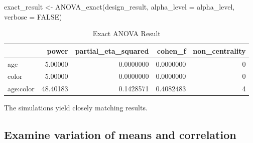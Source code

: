 \documentclass[
]{book}
\newenvironment{Shaded}{\begin{snugshade}}{\end{snugshade}}
\newcommand{\AttributeTok}[1]{\textcolor[rgb]{0.77,0.63,0.00}{#1}}
\newcommand{\ConstantTok}[1]{\textcolor[rgb]{0.00,0.00,0.00}{#1}}
\newcommand{\FunctionTok}[1]{\textcolor[rgb]{0.00,0.00,0.00}{#1}}
\newcommand{\NormalTok}[1]{#1}
\newcommand{\OtherTok}[1]{\textcolor[rgb]{0.56,0.35,0.01}{#1}}
\begin{document}
\begin{Shaded}
\begin{Highlighting}[]
\NormalTok{exact\_result }\OtherTok{\textless{}{-}} \FunctionTok{ANOVA\_exact}\NormalTok{(design\_result,}
                            \AttributeTok{alpha\_level =}\NormalTok{ alpha\_level,}
                            \AttributeTok{verbose =} \ConstantTok{FALSE}\NormalTok{)}
\end{Highlighting}
\end{Shaded}

\begin{table}[!h]

\caption{\label{tab:unnamed-chunk-122}Exact ANOVA Result}
\centering
\begin{tabular}[t]{l|r|r|r|r}
\hline
  & power & partial\_eta\_squared & cohen\_f & non\_centrality\\
\hline
age & 5.00000 & 0.0000000 & 0.0000000 & 0\\
\hline
color & 5.00000 & 0.0000000 & 0.0000000 & 0\\
\hline
age:color & 48.40183 & 0.1428571 & 0.4082483 & 4\\
\hline
\end{tabular}
\end{table}

The simulations yield closely matching results.

\hypertarget{examine-variation-of-means-and-correlation}{%
\subsection{Examine variation of means and correlation}\label{examine-variation-of-means-and-correlation}}
\end{document}
